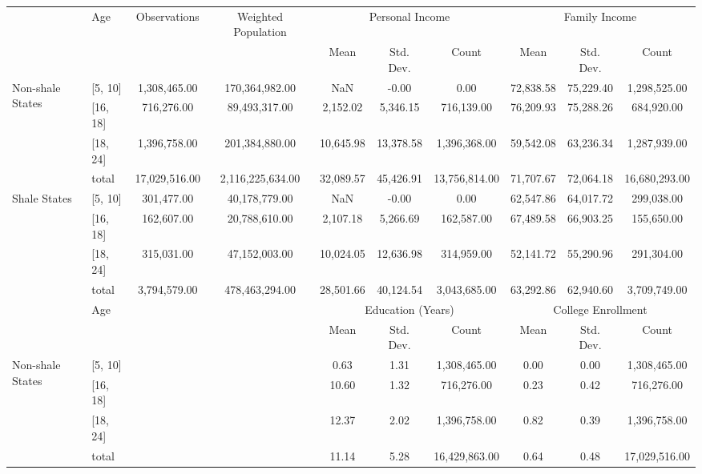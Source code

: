 \begin{table}
\centering
\footnotesize
\begin{tabular}{l|l||c|c|ccc|ccc}
  \hline 
 & Age  & Observations & Weighted Population & \multicolumn{3}{c|}{Personal Income} & \multicolumn{3}{c}{Family Income} \\ 
 &  & & & Mean & Std. Dev. & Count & Mean & Std. Dev. & Count\\ 
  \hline 
   \multirow{4}{*}{Non-shale States} & [5, 10] & 1,308,465.00 & 170,364,982.00 & NaN & -0.00 & 0.00 & 72,838.58 & 75,229.40 & 1,298,525.00 \\ 
   & [16, 18] & 716,276.00 & 89,493,317.00 & 2,152.02 & 5,346.15 & 716,139.00 & 76,209.93 & 75,288.26 & 684,920.00 \\ 
   & [18, 24] & 1,396,758.00 & 201,384,880.00 & 10,645.98 & 13,378.58 & 1,396,368.00 & 59,542.08 & 63,236.34 & 1,287,939.00 \\ 
   & total & 17,029,516.00 & 2,116,225,634.00 & 32,089.57 & 45,426.91 & 13,756,814.00 & 71,707.67 & 72,064.18 & 16,680,293.00 \\ 
   \multirow{4}{*}{Shale States} & [5, 10] & 301,477.00 & 40,178,779.00 & NaN & -0.00 & 0.00 & 62,547.86 & 64,017.72 & 299,038.00 \\ 
   & [16, 18] & 162,607.00 & 20,788,610.00 & 2,107.18 & 5,266.69 & 162,587.00 & 67,489.58 & 66,903.25 & 155,650.00 \\ 
   & [18, 24] & 315,031.00 & 47,152,003.00 & 10,024.05 & 12,636.98 & 314,959.00 & 52,141.72 & 55,290.96 & 291,304.00 \\ 
   & total & 3,794,579.00 & 478,463,294.00 & 28,501.66 & 40,124.54 & 3,043,685.00 & 63,292.86 & 62,940.60 & 3,709,749.00 \\ 
   \hline \hline
   & Age & \multirow{10}{*}{} & \multirow{10}{*}{}& \multicolumn{3}{c|}{Education (Years)} & \multicolumn{3}{c}{College Enrollment} \\ 
  & &  & & Mean & Std. Dev. & Count  & Mean & Std. Dev. & Count  \\ 
  \hline
   \multirow{4}{*}{Non-shale States} & [5, 10] & &  & 0.63 & 1.31 & 1,308,465.00 & 0.00 & 0.00 & 1,308,465.00 \\ 
   & [16, 18] & &  & 10.60 & 1.32 & 716,276.00 & 0.23 & 0.42 & 716,276.00 \\ 
   & [18, 24] &  &  & 12.37 & 2.02 & 1,396,758.00 & 0.82 & 0.39 & 1,396,758.00 \\ 
   & total &  & & 11.14 & 5.28 & 16,429,863.00 & 0.64 & 0.48 & 17,029,516.00 \\ 

\end{tabular}
\end{table}
